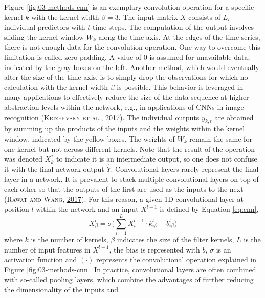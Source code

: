 \documentclass[a4paper,11pt]{article}
\begin{document}
Figure \ref{fig:03-methods-cnn} is an exemplary convolution operation for a specific
kernel \(k\) with the kernel width \(\beta=3\). The input matrix \(X\) consists of \(L_i\)
individual predictors with \(t\) time steps. The computation of the output involves
sliding the kernel window \(W_k\) along the time axis. At the edges of the time series,
there is not enough data for the convolution operation. One way to overcome this
limitation is called zero-padding.
A value of 0 is assumed for unavailable data, indicated by the gray boxes on the left.
Another method, which would eventually alter the size of the time axis,
is to simply drop the observations for which no calculation with the kernel width \(\beta\)
is possible. This behavior is leveraged in many applications to effectively
reduce the size of the data sequence at higher abstraction levels within the
network, e.g., in applications of CNNs in image recognition \textsc{(\textnormal{\textsc{Krizhevsky} \textsc{et al.}}, \textnormal{\protect\hyperlink{ref-krizhevsky2017}{2017}})}.
The individual outputs \(y_{k,t}\) are obtained by summing
up the products of the inputs and the weights within the kernel window, indicated
by the yellow boxes. The weights of \(W_k\) remain the same for one kernel but
not across different kernels. Note that the result of the operation was denoted
\(X^*_k\) to indicate it is an intermediate output, so one does not confuse it with
the final network output \(\hat{Y}\). Convolutional layers rarely represent the
final layer in a network. It is prevalent to stack multiple convolutional
layers on top of each other so that the outputs of the first are used as the inputs
to the next \textsc{(\textnormal{\textsc{Rawat} and \textsc{Wang}}, \textnormal{\protect\hyperlink{ref-rawat2017}{2017}})}. For this reason, a given 1D convolutional layer at position \(l\) within the network
and an input \(X^{l-1}\) is defined by Equation \eqref{eq:cnn},
\begin{equation}
X^l_\beta = \sigma \Big( \sum\limits^L_{i=1} X^{l-1}_i \cdot k^l_{i\beta} + b^l_{i\beta} \Big)
\label{eq:cnn}
\end{equation}
where \(k\) is the number of kernels, \(\beta\) indicates the size of the filter kernels,
\(L\) is the number of input features in \(X^{l-1}\), the bias is represented with \(b\),
\(\sigma\) is an activation function and \((\cdot)\) represents the convolutional operation
explained in Figure \ref{fig:03-methods-cnn}. In practice, convolutional layers are often combined with so-called pooling layers,
which combine the advantages of further reducing the dimensionality of the inputs and
\end{document}

